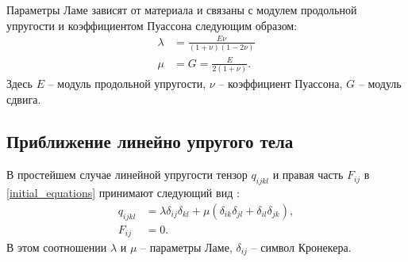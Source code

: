 	Параметры Ламе зависят от материала и связаны с модулем продольной упругости и коэффициентом Пуассона следующим образом:
\begin{align}
	\label{lame_parameters}
	\lambda &= \frac{E\nu}{(1+\nu)(1-2\nu)}
	\nonumber\\
	\mu &= G=\frac{E}{2(1+\nu)}.
\end{align}
	Здесь $E$ -- модуль продольной упругости, $\nu$ -- коэффициент Пуассона, $G$ -- модуль сдвига.
\clearpage
\newpage

\subsection{Приближение линейно упругого тела}
	
	В простейшем случае линейной упругости тензор $q_{ijkl}$ и правая часть $F_{ij}$ в \eqref{initial_equations} принимают следующий вид \cite{landau_lifshits}:
\begin{align}
	\label{tensor_qijkl_elastic}
	q_{ijkl}&=\lambda\delta_{ij}\delta_{kl}+\mu(\delta_{ik}\delta_{jl}+\delta_{il}
	\delta_{jk}),\nonumber\\
	F_{ij}&=0.
\end{align}
	В этом соотношении $\lambda$ и $\mu$ -- параметры Ламе, $\delta_{ij}$ -- символ Кронекера.
	
